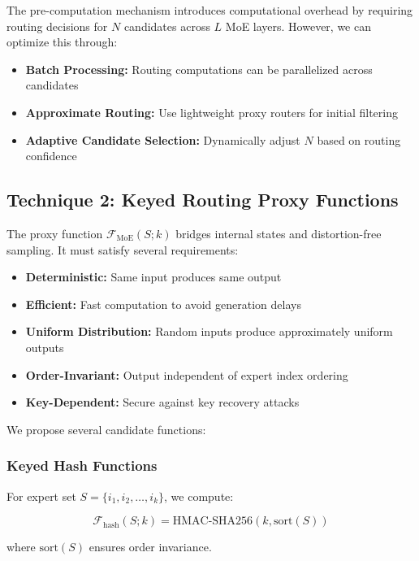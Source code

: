 \documentclass[letterpaper,twocolumn,10pt]{article}
\begin{document}
The pre-computation mechanism introduces computational overhead by requiring routing decisions for $N$ candidates across $L$ MoE layers. However, we can optimize this through:

\begin{itemize}
\item \textbf{Batch Processing:} Routing computations can be parallelized across candidates
\item \textbf{Approximate Routing:} Use lightweight proxy routers for initial filtering
\item \textbf{Adaptive Candidate Selection:} Dynamically adjust $N$ based on routing confidence
\end{itemize}

\subsection{Technique 2: Keyed Routing Proxy Functions}

The proxy function $\mathcal{F}_{\text{MoE}}(S; k)$ bridges internal states and distortion-free sampling. It must satisfy several requirements:

\begin{itemize}
\item \textbf{Deterministic:} Same input produces same output
\item \textbf{Efficient:} Fast computation to avoid generation delays
\item \textbf{Uniform Distribution:} Random inputs produce approximately uniform outputs
\item \textbf{Order-Invariant:} Output independent of expert index ordering
\item \textbf{Key-Dependent:} Secure against key recovery attacks
\end{itemize}

We propose several candidate functions:

\subsubsection{Keyed Hash Functions}

For expert set $S = \{i_1, i_2, \ldots, i_k\}$, we compute:

\begin{equation}
\mathcal{F}_{\text{hash}}(S; k) = \text{HMAC-SHA256}(k, \text{sort}(S))
\end{equation}

where $\text{sort}(S)$ ensures order invariance.
\end{document}
